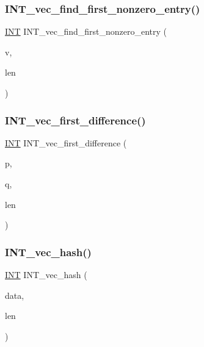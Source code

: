\subsubsection{\texorpdfstring{I\+N\+T\+\_\+vec\+\_\+find\+\_\+first\+\_\+nonzero\+\_\+entry()}{INT\_vec\_find\_first\_nonzero\_entry()}}
{\footnotesize\ttfamily \mbox{\hyperlink{galois_8h_a09fddde158a3a20bd2dcadb609de11dc}{I\+NT}} I\+N\+T\+\_\+vec\+\_\+find\+\_\+first\+\_\+nonzero\+\_\+entry (\begin{DoxyParamCaption}\item[{\mbox{\hyperlink{galois_8h_a09fddde158a3a20bd2dcadb609de11dc}{I\+NT}} $\ast$}]{v,  }\item[{\mbox{\hyperlink{galois_8h_a09fddde158a3a20bd2dcadb609de11dc}{I\+NT}}}]{len }\end{DoxyParamCaption})}

\mbox{\label{util_8_c_af9b14fa69c0c17ae6b9be0bde400f755}} 
\subsubsection{\texorpdfstring{I\+N\+T\+\_\+vec\+\_\+first\+\_\+difference()}{INT\_vec\_first\_difference()}}
{\footnotesize\ttfamily \mbox{\hyperlink{galois_8h_a09fddde158a3a20bd2dcadb609de11dc}{I\+NT}} I\+N\+T\+\_\+vec\+\_\+first\+\_\+difference (\begin{DoxyParamCaption}\item[{\mbox{\hyperlink{galois_8h_a09fddde158a3a20bd2dcadb609de11dc}{I\+NT}} $\ast$}]{p,  }\item[{\mbox{\hyperlink{galois_8h_a09fddde158a3a20bd2dcadb609de11dc}{I\+NT}} $\ast$}]{q,  }\item[{\mbox{\hyperlink{galois_8h_a09fddde158a3a20bd2dcadb609de11dc}{I\+NT}}}]{len }\end{DoxyParamCaption})}

\mbox{\label{util_8_c_a2c14b1034b07b03b4df943066edeb99f}} 
\subsubsection{\texorpdfstring{I\+N\+T\+\_\+vec\+\_\+hash()}{INT\_vec\_hash()}\hspace{0.1cm}{\footnotesize\ttfamily [1/2]}}
{\footnotesize\ttfamily \mbox{\hyperlink{galois_8h_a09fddde158a3a20bd2dcadb609de11dc}{I\+NT}} I\+N\+T\+\_\+vec\+\_\+hash (\begin{DoxyParamCaption}\item[{\mbox{\hyperlink{galois_8h_a09fddde158a3a20bd2dcadb609de11dc}{I\+NT}} $\ast$}]{data,  }\item[{\mbox{\hyperlink{galois_8h_a09fddde158a3a20bd2dcadb609de11dc}{I\+NT}}}]{len }\end{DoxyParamCaption})}

